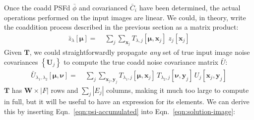 \documentclass[DM,authoryear,toc]{lsstdoc}
\begin{document}
Once the coadd PSFd $\bar{\phi}$ and covarianced $\bar{C}_i$ have been determined, the actual operations performed on the input images are linear.
We could, in theory, write the coaddition process described in the previous section as a matrix product:
\begin{align}
    \bar{z}_{\lambda}[\bm{\mu}]
    =&\;
    \sum_j \sum_{\bm{x}_j}
    T_{\lambda,j}[\bm{\mu},\bm{x}_j]
    \;
    z_j[\bm{x}_j]
\end{align}
Given $\bm{T}$, we could straightforwardly propagate \emph{any} set of true input image noise covariances $\left\{\bm{U}_j\right\}$ to compute the true coadd noise covariance matrix $\bar{U}$:
\begin{align}
    \bar{U}_{\lambda_1,\lambda_2}[\bm{\mu},\bm{\nu}]
    =&\;
    \sum_j \sum_{\bm{x}_j,\bm{y}_j}
    T_{\lambda_1,j}[\bm{\mu},\bm{x}_j]
    \,
    T_{\lambda_2,j}[\bm{\nu},\bm{y}_j]
    \,
    U_j[\bm{x}_j,\bm{y}_j]
\end{align}
$\bm{T}$ has $\bm{W} \times |F|$ rows and $\sum\limits_j|E_j|$ columns, making it much too large to compute in full, but it will be useful to have an expression for its elements.
We can derive this by inserting Eqn.~\ref{eqn:psi-accumulated} into Eqn.~\ref{eqn:solution-image}:
\end{document}
